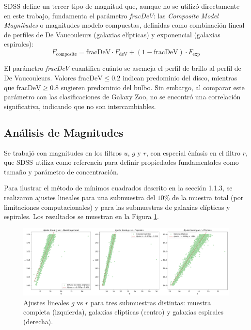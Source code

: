 \documentclass[twocolumn]{article}
\begin{document}
SDSS define un tercer tipo de magnitud que, aunque no se utilizó directamente en este trabajo, fundamenta el parámetro \textit{fracDeV}: las \textit{Composite Model Magnitudes} o magnitudes modelo compuestas, definidas como combinación lineal de perfiles de De Vaucouleurs (galaxias elípticas) y exponencial (galaxias espirales):
\[F_{\text{composite}} = \text{fracDeV} \cdot F_{\text{deV}} + (1 - \text{fracDeV}) \cdot F_{\text{exp}}\]

El parámetro \textit{fracDeV} cuantifica cuánto se asemeja el perfil de brillo al perfil de De Vaucouleurs. Valores $\text{fracDeV} \leq 0.2$ indican predominio del disco, mientras que $\text{fracDeV} \geq 0.8$ sugieren predominio del bulbo. Sin embargo, al comparar este parámetro con las clasificaciones de Galaxy Zoo, no se encontró una correlación significativa, indicando que no son intercambiables.

\subsection{Análisis de Magnitudes}

Se trabajó con magnitudes en los filtros $u$, $g$ y $r$, con especial énfasis en el filtro $r$, que SDSS utiliza como referencia para definir propiedades fundamentales como tamaño y parámetro de concentración.

Para ilustrar el método de mínimos cuadrados descrito en la sección 1.1.3, se realizaron ajustes lineales para una submuestra del $10\%$ de la muestra total (por limitaciones computacionales) y para las submuestras de galaxias elípticas y espirales. Los resultados se muestran en la Figura \ref{fig:lineal}.

\begin{figure}[ht]
\includegraphics[width=\linewidth]{ajustes_lineales_comparacion.pdf}
\caption{Ajustes lineales $g$ vs $r$ para tres submuestras distintas: muestra completa (izquierda), galaxias elípticas (centro) y galaxias espirales (derecha).}
\label{fig:lineal}
\end{figure}
\end{document}
